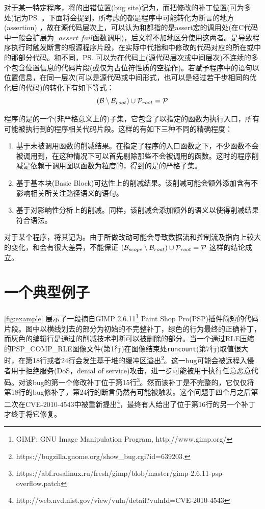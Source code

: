 对于某一特定程序，将\prog 的出错位置(bug site)记为\prog\bs ，而把修改的补丁位置(可为多处)记为\prog\ps 。下面将会提到，\dryrun 所考虑的\prog\bs 都是程序中可能转化为断言的地方(assertion) \prog\ass ，故在源代码层次上，可以认为\prog\ass 和\prog\bs 都指的是assert宏的调用处(在C代码中一般会扩展为$\_\_assert\_fail$函数调用)，后文将不加地区分使用这两者。\prog\bs 是导致程序执行时触发断言的根源程序片段，在实际中代指\bug 和\patch 中修改的代码对应的所在\bug 或\patch 中的那部分代码。和\prog\bs 不同，\prog\ps 可以为在代码上(源代码层次或中间层次)不连续的多个包含位置信息的代码片段(或仅为占位符性质的空操作)。若赋予程序中的语句以位置信息，在同一层次(可以是源代码或中间形式，也可以是经过若干步相同的优化后的代码)的转化下有如下等式：
\begin{displaymath}
  (\mathcal{B} \setminus \mathcal{B}_{root} )\cup \mathcal{P}_{root} = \mathcal{P}
\end{displaymath}

程序的\rbscope 是\prog 的一个(非严格意义上的)子集，它包含了以指定的函数为执行入口，所有可能被执行到的程序相关代码片段。这样的\rbscope 有如下三种不同的精确程度：
\begin{enumerate}
\item 基于未被调用函数的削减结果。在指定了程序的入口函数之下，不少函数不会被调用到，在这种情况下可以首先剔除那些不会被调用的函数。这时的程序削减是依赖于调用图以函数为粒度的，得到的\rbscope 是\prog 的严格子集。
\item 基于基本块(Basic Block)可达性上的削减结果。该削减可能会额外添加含有不影响相关所关注路径语义的语句。
\item 基于对\prog\bs 影响性分析上的削减。同样，该削减会添加额外的语义以使得削减结果符合语法。
\end{enumerate}

对于某个程序\prog ，将其\rbscope 记为\prog\scope 。由于所做改动可能会导致数据流和控制流及指向上较大的变化，\bug\scope 和\patch\scope 会有很大差异，不能保证 $(\mathcal{B}_{scope} \setminus \mathcal{B}_{root} )\cup \mathcal{P}_{root} = \mathcal{P}$ 这样的结论成立。

\section{一个典型例子}
\label{sec:gimp_example}

\autoref{fig:example} 展示了一段摘自GIMP 2.6.11\footnote{GIMP: GNU Image Manipulation Program, http://www.gimp.org/} Paint Shop Pro(PSP)插件简短的代码片段。图中以横线划去的部分为初始的不完整补丁，绿色的行为最终的正确补丁，而灰色的编辑行是通过\dryrun 的削减技术判断可以被删除的部分。当一个通过RLE压缩的PSP\_COMP\_RLE图像文件(第1行)在图像结束处{\tt runcount}(第7行)取值很大时，在第18行或者24行会发生基于堆的缓冲区溢出\footnote{https://bugzilla.gnome.org/show\_bug.cgi?id=639203.}。这一bug可能会被远程入侵者用于拒绝服务(DoS，denial of service)攻击，进一步可能被用于执行任意恶意代码。对该bug的第一个修改补丁位于第15行\footnote{https://abf.rosalinux.ru/fresh/gimp/blob/master/gimp-2.6.11-psp-overflow.patch}。然而该补丁是不完整的，它仅仅将第18行的bug修补了，第24行的断言仍然有可能被触发。这个问题于四个月之后第二次在CVE-2010-4543中被重新提出\footnote{http://web.nvd.nist.gov/view/vuln/detail?vulnId=CVE-2010-4543}，最终有人给出了位于第16行的另一个补丁才终于将它修复。

